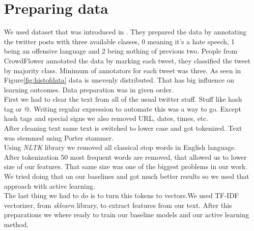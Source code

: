 \documentclass[10pt, a4paper]{article}
\begin{document}
\section{Preparing data}
We used dataset that was introduced in \cite{Davidson2017AutomatedHS}. They prepared the data by annotating the twitter posts with three available classes, 0 meaning it's a hate speech, 1 being an offensive language and 2 being nothing of previous two. People from CrowdFlower annotated the data by marking each tweet, they classified the tweet by majority class. Minimum of annotators for each tweet was three.
As seen in Figure\ref{fig:histofdata} data is unevenly distributed. That has big influence on learning outcomes. Data preparation was in given order.
\\First we had to clear the text from all of the usual twitter stuff. Stuff like hash tag or @. Writing regular expression to automate this was a way to go. Except hash tags and special signs we also removed URL, dates, times, etc.
\\After cleaning text same text is switched to lower case and got tokenized. Text was stemmed using Porter stammer.
\\Using \textit{NLTK} library we removed all classical stop words in English language. After tokenization 50 most frequent words are removed, that allowed us to lower size of our features. That same size was one of the biggest problems in our work.
We tried doing that on our baselines and got much better results so we used that approach with active learning.
\\The last thing we had to do is to turn this tokens to vectors.We used TF-IDF vectorizer, from \textit{sklearn} library, to extract features from our text. After this preparations we where ready to train our baseline models and our active learning method.
\begin{table}[!t]
	\centering
	\caption{First row shows the original tweet post from dataset, the second row shows cleaned, tokenized and steammed tweet post}
	\label{tbl:prepData}
\end{table}
\end{document}
